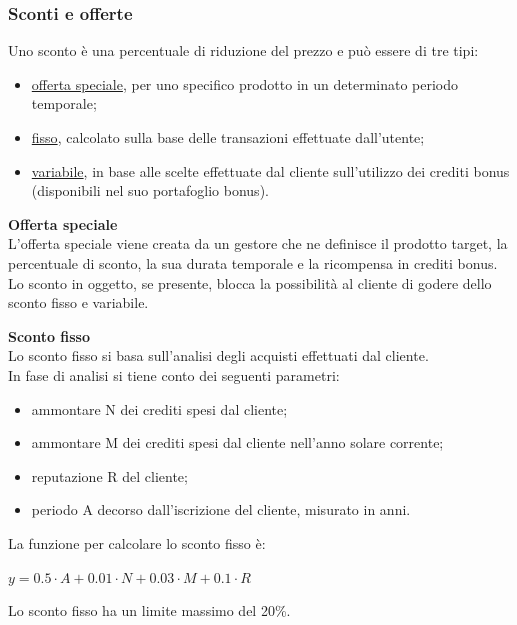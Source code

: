 \documentclass[a4paper, 14pt]{article}
\begin{document}
\begin{flushleft}
			\subsubsection{Sconti e offerte}
				Uno sconto è una percentuale di riduzione del prezzo e può essere di tre tipi:
				\begin{itemize}
					\item \underline{offerta speciale}, per uno specifico prodotto in un determinato periodo temporale;
					\item \underline{fisso}, calcolato sulla base delle transazioni effettuate dall’utente;
					\item \underline{variabile}, in base alle scelte effettuate dal cliente sull’utilizzo dei crediti bonus (disponibili nel suo portafoglio bonus).
				\end{itemize}
			
				\bigskip \textbf{Offerta speciale} \\ \smallskip
				L'offerta speciale viene creata da un gestore che ne definisce il prodotto target, la percentuale di sconto, la sua durata temporale e la ricompensa in crediti bonus.
				Lo sconto in oggetto, se presente, blocca la possibilità al cliente di godere dello sconto fisso e variabile.
				
				\bigskip \textbf{Sconto fisso} \\ \smallskip
				Lo sconto fisso si basa sull'analisi degli acquisti effettuati dal cliente. \\
				In fase di analisi si tiene conto dei seguenti parametri:
				\begin{itemize}
					\item ammontare N dei crediti spesi dal cliente;
					\item ammontare M dei crediti spesi dal cliente nell'anno solare corrente;
					\item reputazione R del cliente;
					\item periodo A decorso dall'iscrizione del cliente, misurato in anni.
				\end{itemize}
				La funzione per calcolare lo sconto fisso è:
				\begin{center}
					$ y = 0.5 \cdot A + 0.01 \cdot N + 0.03 \cdot M + 0.1 \cdot R $
				\end{center}
				Lo sconto fisso ha un limite massimo del 20\%.
				

\end{flushleft}
\end{document}
